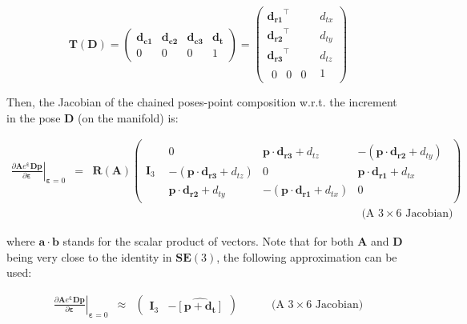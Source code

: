 \documentclass[a4paper,11pt]{report}
\newcommand{\E}{{\bm{\varepsilon}}}
\newcommand{\A}{{\mathbf{A}}}
\newcommand{\D}{{\mathbf{D}}}
\newcommand{\I}{{\mathbf{I}}}
\begin{document}
\begin{equation}
\mathbf{T}(\mathbf{D}) =
\left(
\begin{array}{ccc|c}
 \mathbf{d_{c1}}  & \mathbf{d_{c2}}  & \mathbf{d_{c3}}  & \mathbf{d_{t}}  \\
\hline
  0 & 0 & 0 & 1
\end{array}
\right)
=
\left(
\begin{array}{c|c}
    \mathbf{d_{r1}}^\top  & d_{tx}  \\
    \mathbf{d_{r2}}^\top  & d_{ty} \\
    \mathbf{d_{r3}}^\top  & d_{tz} \\
\hline
  \begin{array}{ccc}
    0  & 0  & 0
  \end{array}
    & 1
\end{array}
\right)
\end{equation}


Then, the Jacobian of the chained poses-point composition w.r.t.
the increment in the pose $\D$ (on the manifold) is:

\begin{eqnarray}
\left. \frac{\partial \A e^\E \D \mathbf{p}}{\partial \E} \right|_{\E = 0}
&=&
\mathbf{R}(\A)
\left(
\begin{array}{c|c}
  \I_3 &
    \begin{array}{ccc}
      0  & \mathbf{p} \cdot \mathbf{d_{r3}} + d_{tz}  & -(\mathbf{p} \cdot \mathbf{d_{r2}} + d_{ty}) \\
      -(\mathbf{p} \cdot \mathbf{d_{r3}} + d_{tz})  & 0 & \mathbf{p} \cdot \mathbf{d_{r1}} + d_{tx} \\
      \mathbf{p} \cdot \mathbf{d_{r2}} + d_{ty}  & -(\mathbf{p} \cdot \mathbf{d_{r1}} + d_{tx}) & 0
    \end{array}
\end{array}
\right)
\\
&&
\quad \quad \quad \quad \quad \quad \quad \quad \quad \quad \quad \quad
\quad \quad \quad \quad \quad \quad \quad \quad \quad \quad \quad \quad
\text{(A $3 \times 6$ Jacobian)} \nonumber
\end{eqnarray}

\noindent where $\mathbf{a} \cdot \mathbf{b}$ stands for the scalar product of vectors.
Note that for both $\A$ and $\D$ being very close to the identity in $\mathbf{SE}(3)$,
the following approximation can be used:

\begin{eqnarray}
\left. \frac{\partial \A e^\E \D \mathbf{p}}{\partial \E} \right|_{\E = 0}
& \approx &
\left(
\begin{array}{cc}
  \I_3 &
  - \widehat{\left[ \mathbf{p} + \mathbf{d_t} \right]}
\end{array}
\right)
\quad \quad \quad
\text{(A $3 \times 6$ Jacobian)} \nonumber
\end{eqnarray}
\end{document}
